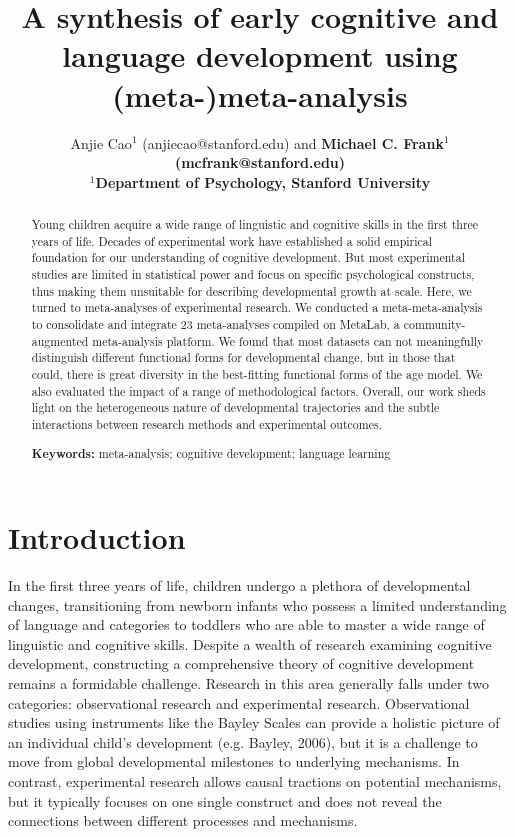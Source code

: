 \documentclass[10pt, letterpaper]{article}
\title{A synthesis of early cognitive and language development using
(meta-)meta-analysis}
\author{Anjie Cao$^1$  (anjiecao@stanford.edu)
 and \bf{Michael C. Frank$^1$ (mcfrank@stanford.edu)} \\
$^1$Department of Psychology, Stanford University }
\begin{document}
\maketitle

\begin{abstract}
Young children acquire a wide range of linguistic and cognitive skills
in the first three years of life. Decades of experimental work have
established a solid empirical foundation for our understanding of
cognitive development. But most experimental studies are limited in
statistical power and focus on specific psychological constructs, thus
making them unsuitable for describing developmental growth at scale.
Here, we turned to meta-analyses of experimental research. We conducted
a meta-meta-analysis to consolidate and integrate 23 meta-analyses
compiled on MetaLab, a community-augmented meta-analysis platform. We
found that most datasets can not meaningfully distinguish different
functional forms for developmental change, but in those that could,
there is great diversity in the best-fitting functional forms of the age
model. We also evaluated the impact of a range of methodological
factors. Overall, our work sheds light on the heterogeneous nature of
developmental trajectories and the subtle interactions between research
methods and experimental outcomes.

\textbf{Keywords:}
meta-analysis; cognitive development; language learning
\end{abstract}

\hypertarget{introduction}{%
\section{Introduction}\label{introduction}}

In the first three years of life, children undergo a plethora of
developmental changes, transitioning from newborn infants who possess a
limited understanding of language and categories to toddlers who are
able to master a wide range of linguistic and cognitive skills. Despite
a wealth of research examining cognitive development, constructing a
comprehensive theory of cognitive development remains a formidable
challenge. Research in this area generally falls under two categories:
observational research and experimental research. Observational studies
using instruments like the Bayley Scales can provide a holistic picture
of an individual child's development (e.g. Bayley, 2006), but it is a
challenge to move from global developmental milestones to underlying
mechanisms. In contrast, experimental research allows causal tractions
on potential mechanisms, but it typically focuses on one single
construct and does not reveal the connections between different
processes and mechanisms.
\end{document}

